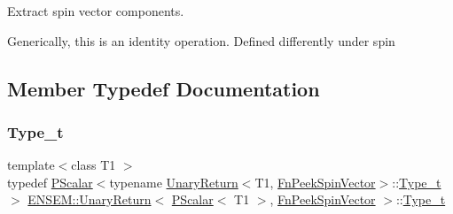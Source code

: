 Extract spin vector components. 

Generically, this is an identity operation. Defined differently under spin 

\subsection{Member Typedef Documentation}
\mbox{\label{structENSEM_1_1UnaryReturn_3_01PScalar_3_01T1_01_4_00_01FnPeekSpinVector_01_4_ac623af45f4638d6db8fefb084c447ef0}} 
\subsubsection{\texorpdfstring{Type\_t}{Type\_t}\hspace{0.1cm}{\footnotesize\ttfamily [1/2]}}
{\footnotesize\ttfamily template$<$class T1 $>$ \\
typedef \mbox{\hyperlink{classENSEM_1_1PScalar}{P\+Scalar}}$<$typename \mbox{\hyperlink{structENSEM_1_1UnaryReturn}{Unary\+Return}}$<$T1, \mbox{\hyperlink{structENSEM_1_1FnPeekSpinVector}{Fn\+Peek\+Spin\+Vector}}$>$\+::\mbox{\hyperlink{structENSEM_1_1UnaryReturn_3_01PScalar_3_01T1_01_4_00_01FnPeekSpinVector_01_4_ac623af45f4638d6db8fefb084c447ef0}{Type\+\_\+t}}$>$ \mbox{\hyperlink{structENSEM_1_1UnaryReturn}{E\+N\+S\+E\+M\+::\+Unary\+Return}}$<$ \mbox{\hyperlink{classENSEM_1_1PScalar}{P\+Scalar}}$<$ T1 $>$, \mbox{\hyperlink{structENSEM_1_1FnPeekSpinVector}{Fn\+Peek\+Spin\+Vector}} $>$\+::\mbox{\hyperlink{structENSEM_1_1UnaryReturn_3_01PScalar_3_01T1_01_4_00_01FnPeekSpinVector_01_4_ac623af45f4638d6db8fefb084c447ef0}{Type\+\_\+t}}}

\mbox{\label{structENSEM_1_1UnaryReturn_3_01PScalar_3_01T1_01_4_00_01FnPeekSpinVector_01_4_ac623af45f4638d6db8fefb084c447ef0}} 

